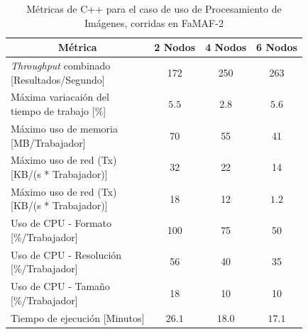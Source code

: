 \documentclass[11pt]{article}
\providecommand{\row}[1]{\parbox{150pt}{\setlength{\baselineskip}{0.2\baselineskip}\strut#1\strut}}
\newcommand{\ipcap}[2]{\caption{Métricas de #1 para el caso de uso de Procesamiento de Imágenes, corridas en #2}}
\newcommand{\english}[1]{\textit{#1}}
\begin{document}
\begin{table}[H]
\centering
\begin{tabular}{|l|c|c|c|}
\hline
\multicolumn{1}{|c|}{Métrica} & 2 Nodos & 4 Nodos & 6 Nodos \\ \hline
\row{\english{Throughput} combinado\\{[Resultados/Segundo]}} & 172 & 250 & 263 \\ \hline
\row{Máxima variacaión del \\ tiempo de trabajo {[}\%{]}} & $5.5$ & $2.8$ & $5.6$ \\ \hline
\row{Máximo uso de memoria \\ {[MB/Trabajador]}} & 70 & 55 & 41 \\ \hline
\row{Máximo uso de red (Tx) \\ {[KB/(s * Trabajador)]}} & 32 & 22 & 14 \\ \hline
\row{Máximo uso de red (Tx) \\ {[KB/(s * Trabajador)]}} & 18 & 12 & $1.2$  \\ \hline
\row{Uso de CPU - Formato\\{[\%/Trabajador]}} & 100 & 75  & 50 \\ \hline
\row{Uso de CPU - Resolución\\{[\%/Trabajador]}} & 56 & 40 & 35 \\ \hline
\row{Uso de CPU - Tamaño\\{[\%/Trabajador]}} & 18 & 10 & 10 \\ \hline
Tiempo de ejecución [Minutos] & $26.1$ & $18.0$ & $17.1$ \\ \hline
\end{tabular}
\ipcap{C++}{FaMAF-2}
\end{table}
\end{document}
